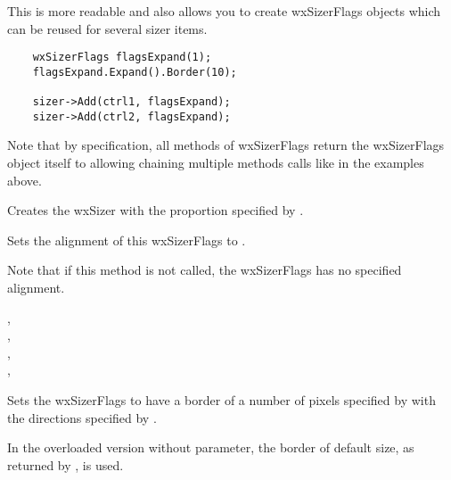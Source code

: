 This is more readable and also allows you to create wxSizerFlags objects which
can be reused for several sizer items.
\begin{verbatim}
    wxSizerFlags flagsExpand(1);
    flagsExpand.Expand().Border(10);

    sizer->Add(ctrl1, flagsExpand);
    sizer->Add(ctrl2, flagsExpand);
\end{verbatim}

Note that by specification, all methods of wxSizerFlags return the wxSizerFlags
object itself to allowing chaining multiple methods calls like in the examples
above.


\label{wxsizerflagsctor}


Creates the wxSizer with the proportion specified by .


\label{wxsizerflagsalign}


Sets the alignment of this wxSizerFlags to .

Note that if this method is not called, the wxSizerFlags has no specified alignment.


,\\
,\\
,\\
,\\


\label{wxsizerflagsborder}



Sets the wxSizerFlags to have a border of a number of pixels specified by
 with the directions specified by .

In the overloaded version without  parameter, the border of
default size, as returned by ,
is used.


\label{wxsizerflagsbottom}

